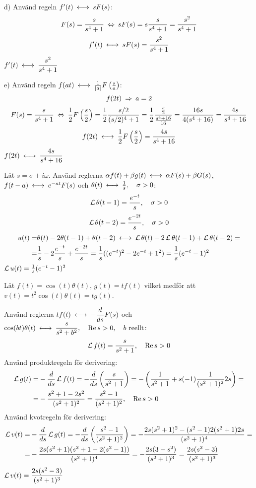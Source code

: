 \begin{task}{d)}
	Använd regeln $f'(t) \llra sF(s)$:
	\begin{align*}
	F(s)=
	\frac{s}{s^4+1} \lra 
	sF(s)=
	s\frac{s}{s^4+1}=
	\frac{s^2}{s^4+1}
	\end{align*}
	\[f'(t) \llra sF(s)=\frac{s^2}{s^4+1}\]
	\ans $f'(t) \llra \dfrac{s^2}{s^4+1}$
\end{task}

\begin{task}{e)}
	Använd regeln $f(at) \llra \frac{1}{\abs{a}}F\left(\frac{s}{a}\right)$:
	\[f(2t) \ra a=2\]
	\begin{align*}
	F(s)=
	\frac{s}{s^4+1} \lra 
	\frac{1}{2}F\left(\frac{s}{2}\right)=
	\frac{1}{2}\frac{s/2}{(s/2)^4+1}=
	\frac{1}{2}\frac{\frac{s}{2}}{\frac{s^4+16}{16}}=
	\frac{16s}{4(s^4+16)}=
	\frac{4s}{s^4+16}
	\end{align*}
	\[f(2t) \llra \frac{1}{2}F\left(\frac{s}{2}\right)=\frac{4s}{s^4+16}\]
	\ans $f(2t) \llra \dfrac{4s}{s^4+16}$
\end{task}

\begin{task}{3.5}
	Låt $s=\sigma + i\omega$. Använd reglerna $\alpha f(t)+\beta g(t) \llra \alpha F(s)+\beta G(s)$, $f(t-a) \llra e^{-at}F(s)$ och $\theta(t)\llra \frac{1}{s}\cond{\sigma > 0}$:
	\[\operatorname{\mathcal{L}}\theta(t-1) = \frac{e^{-t}}{s}, \quad \sigma > 0\]
	\[\operatorname{\mathcal{L}}\theta(t-2) = \frac{e^{-2t}}{s}, \quad \sigma > 0\]
	\begin{align*}
	u(t)=
	&\theta(t)-2\theta(t-1)+\theta(t-2) \llra
	\laplace\theta(t)-2\laplace\theta(t-1)+\laplace\theta(t-2)= \\ =
	&\frac{1}{s}-2\frac{e^{-t}}{s}+\frac{e^{-2t}}{s}=
	\frac{1}{s}((e^{-t})^2-2e^{-t}+1^2)=
	\frac{1}{s}(e^{-t}-1)^2
	\end{align*}
	\ans $\operatorname{\mathcal{L}} u(t) = \frac{1}{s}(e^{-t}-1)^2$
\end{task}

\begin{task}{3.6}
	Låt $f(t)=\cos(t)\theta(t)$, $g(t)=tf(t)$ vilket medför att $v(t)=t^2\cos (t)\theta(t)=tg(t)$.
	
	Använd reglerna $tf(t) \llra -\dfrac{d}{ds}F(s)$ och $\cos(bt)\theta(t)\llra\dfrac{s}{s^2+b^2}\cond{\Re s > 0}\cond{b\text{ reellt}}$:
	\[\operatorname{\mathcal{L}} f(t)=\frac{s}{s^2+1}, \quad \operatorname{Re} s > 0\]
	Använd produktregeln för derivering:
	\begin{align*}
	\laplace g(t)=
	&-\frac{d}{ds}\laplace f(t)=
	-\frac{d}{ds}\left(\frac{s}{s^2+1}\right)=
	-\left(\frac{1}{s^2+1}+s\*(-1)\*\frac{1}{(s^2+1)^2}\*2s\right)= \\ =
	&-\frac{s^2+1-2s^2}{(s^2+1)^2}=
	\frac{s^2-1}{(s^2+1)^2}\cond{\Re s > 0}
	\end{align*}
	Använd kvotregeln för derivering:
	\begin{align*}
	\operatorname{\mathcal{L}} v(t)=
	&-\frac{d}{ds}\operatorname{\mathcal{L}} g(t)=
	-\frac{d}{ds}\left(\frac{s^2-1}{(s^2+1)^2}\right)=
	-\frac{2s(s^2+1)^2-(s^2-1)2(s^2+1)2s}{(s^2+1)^4}= \\ =
	&-\frac{2s(s^2+1)(s^2+1-2(s^2-1))}{(s^2+1)^4}=
	-\frac{2s(3-s^2)}{(s^2+1)^3}=
	\frac{2s(s^2-3)}{(s^2+1)^3}
	\end{align*}
	\ans $\operatorname{\mathcal{L}} v(t)=\dfrac{2s(s^2-3)}{(s^2+1)^3}$
\end{task}